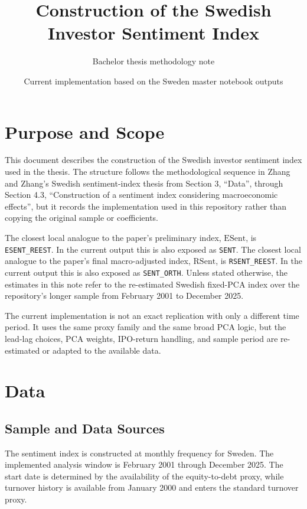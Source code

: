 \documentclass[12pt]{article}
\title{Construction of the Swedish Investor Sentiment Index}
\author{Bachelor thesis methodology note}
\date{Current implementation based on the Sweden master notebook outputs}
\begin{document}
\maketitle

\section{Purpose and Scope}

This document describes the construction of the Swedish investor sentiment index used in the thesis. The structure follows the methodological sequence in Zhang and Zhang's Swedish sentiment-index thesis from Section 3, ``Data'', through Section 4.3, ``Construction of a sentiment index considering macroeconomic effects'', but it records the implementation used in this repository rather than copying the original sample or coefficients.

The closest local analogue to the paper's preliminary index, \(\mathrm{ESent}\), is \texttt{ESENT\_REEST}. In the current output this is also exposed as \texttt{SENT}. The closest local analogue to the paper's final macro-adjusted index, \(\mathrm{RSent}\), is \texttt{RSENT\_REEST}. In the current output this is also exposed as \texttt{SENT\_ORTH}. Unless stated otherwise, the estimates in this note refer to the re-estimated Swedish fixed-PCA index over the repository's longer sample from February 2001 to December 2025.

The current implementation is not an exact replication with only a different time period. It uses the same proxy family and the same broad PCA logic, but the lead-lag choices, PCA weights, IPO-return handling, and sample period are re-estimated or adapted to the available data.

\section{Data}

\subsection{Sample and Data Sources}

The sentiment index is constructed at monthly frequency for Sweden. The implemented analysis window is February 2001 through December 2025. The start date is determined by the availability of the equity-to-debt proxy, while turnover history is available from January 2000 and enters the standard turnover proxy.
\end{document}
